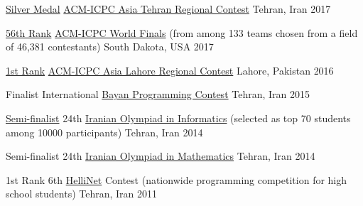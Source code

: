 



\begin{cvhonors}

  \cvhonor
    {\href{https://icpc.baylor.edu/ICPCID/0X1FK464JA9X}{Silver Medal}} %
    {\href{https://icpc.baylor.edu/regionals/finder/tehran-2017/standings}{ACM-ICPC Asia Tehran Regional Contest}} %
    {Tehran, Iran} %
    {2017} %

  \cvhonor
    {\href{https://icpc.baylor.edu/ICPCID/0X1FK464JA9X}{56th Rank}} %
    {\href{https://icpc.baylor.edu/community/results-2017}{ACM-ICPC World Finals} (from among 133 teams chosen from a field of 46,381 contestants)} %
    {South Dakota, USA} %
    {2017} %


  \cvhonor
    {\href{https://icpc.baylor.edu/ICPCID/0X1FK464JA9X}{1st Rank}} %
    {\href{https://icpc.baylor.edu/regionals/finder/lah-2016/standings}{ACM-ICPC Asia Lahore Regional Contest}} %
    {Lahore, Pakistan} %
    {2016} %

 \cvhonor
    {Finalist} %
    {International \href{http://contest.bayan.ir/en/contest/final_2014/scoreboard/}{Bayan Programming Contest}} %
    {Tehran, Iran} %
    {2015} %

 \cvhonor
    {\href{http://www.irysc.com/files/News/93/St2-93/Olym-93-st2.pdf}{Semi-finalist}} %
    {24th \href{http://inoi.ir}{Iranian Olympiad in Informatics} (selected as top 70 students among 10000 participants)} %
    {Tehran, Iran} %
    {2014} %

 \cvhonor
    {Semi-finalist} %
    {24th \href{http://inoi.ir}{Iranian Olympiad in Mathematics}} %
    {Tehran, Iran} %
    {2014} %

  \cvhonor
    {1st Rank} %
    {6th \href{http://hellinet.ir/}{HelliNet} Contest (nationwide programming competition for high school students)} %
    {Tehran, Iran} %
    {2011} %

\end{cvhonors}


